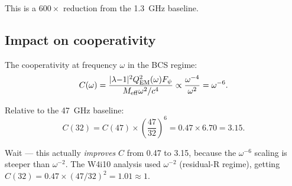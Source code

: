 \documentclass[11pt]{article}
\newcommand{\Meff}{M_{\rm eff}}
\newcommand{\lambdaone}{|\lambda{-}1|}
\newcommand{\QEM}{Q_{\rm EM}}
\newcommand{\Fpsi}{F_\psi}
\begin{document}
This is a $600\times$ reduction from the 1.3~GHz baseline.

\subsection{Impact on cooperativity}

The cooperativity at frequency $\omega$ in the BCS regime:
\begin{equation}
C(\omega) = \frac{\lambdaone^2 \QEM^2(\omega) \Fpsi}
{\Meff \omega^2 / c^4}
\propto \frac{\omega^{-4}}{\omega^2} = \omega^{-6}.
\end{equation}

Relative to the 47~GHz baseline:
\begin{equation}
C(32) = C(47) \times \left(\frac{47}{32}\right)^6 = 0.47 \times 6.70
= 3.15.
\end{equation}

Wait --- this actually \emph{improves} $C$ from 0.47 to 3.15, because the
$\omega^{-6}$ scaling is steeper than $\omega^{-2}$. The W4i10 analysis
used $\omega^{-2}$ (residual-R regime), getting $C(32) = 0.47 \times
(47/32)^2 = 1.01 \approx 1$.
\end{document}
